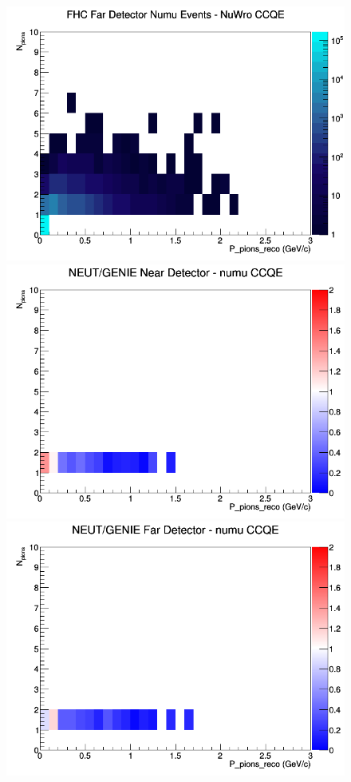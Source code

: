 \documentclass[12pt]{article}
\begin{document}
\begin{figure}[h]
\endminipage
{}
\includegraphics[width=\linewidth]{eff_N_P/FGT/pions/CCQE_FHC_FD_numu_N_P_NuWro.png}
\endminipage
\newline
{}
\includegraphics[width=\linewidth]{eff_N_P/FGT/pions/ratios/CCQE_NEUT_GENIE_numu_near_N_P.png}
\endminipage
{}
\includegraphics[width=\linewidth]{eff_N_P/FGT/pions/ratios/CCQE_NEUT_GENIE_numu_far_N_P.png}

\end{figure}
\end{document}
